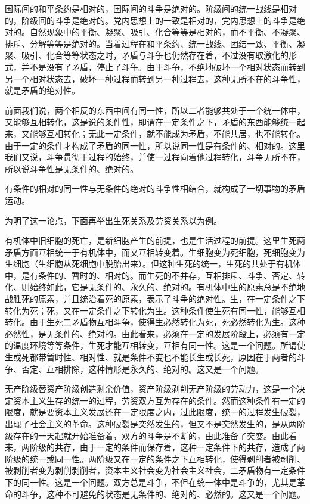 国际间的和平条约是相对的，国际间的斗争是绝对的。阶级间的统一战线是相对的，阶级间的斗争是绝对的。党内思想上的一致是相对的，党内思想上的斗争是绝对的。自然现象中的平衡、凝聚、吸引、化合等等是相对的，而不平衡、不凝聚、排斥、分解等等是绝对的。当着过程在和平条约、统一战线、团结一致、平衡、凝聚、吸引、化合等等状态之时，矛盾与斗争也仍然存在着，不过没有取激化的形式，并不是没有了矛盾，停止了斗争。由于斗争，不绝地破坏一个相对状态而转到另一个相对状态去，破坏一种过程而转到另一种过程去，这种无所不在的斗争性，就是矛盾的绝对性。

前面我们说，两个相反的东西中间有同一性，所以二者能够共处于一个统一体中，又能够互相转化，这是说的条件性，即谓在一定条件之下，矛盾的东西能够统一起来，又能够互相转化；无此一定条件，就不能成为矛盾，不能共居，也不能转化。由于一定的条件才构成了矛盾的同一性，所以说同一性是有条件的、相对的。这里我们又说，斗争贯彻于过程的始终，并使一过程向着他过程转化，斗争无所不在，所以说斗争性是无条件的、绝对的。

有条件的相对的同一性与无条件的绝对的斗争性相结合，就构成了一切事物的矛盾运动。

为明了这一论点，下面再举出生死关系及劳资关系以为例。

有机体中旧细胞的死亡，是新细胞产生的前提，也是生活过程的前提。这里生死两矛盾方面互相统一于有机体中，而又互相转变着。生细胞变为死细胞，死细胞变为生细胞（生细胞从死细胞中脱胎出来）。但这种生死的统一，生死的共处于有机体中，是有条件的、暂时的、相对的。而生死的不并存，互相排斥、斗争、否定、转化、则始终如此，它是无条件的、永久的、绝对的。有机体中生的原素总是不绝地战胜死的原素，并且统治着死的原素，表示了斗争的绝对性。生，在一定条件之下转化为死；死，又在一定条件之下转化为生。这种条件使生死有同一性，能够互相转化。由于生死二矛盾物互相斗争，使得生必然转化为死，死必然转化为生。这种必然性，是无条件的、绝对的。由此看来，必须在一定的发展阶段上，必须有一定的温度环境等等条件，生死才能互相转变，互相有同一性。这是一个问题。所谓使生或死都带暂时性、相对性、就是条件不变也不能长生或长死，原因在于两者的斗争、否定、互相排除，这种情形是永久的、绝对的。这又是一个问题。

无产阶级替资产阶级创造剩余价值，资产阶级剥削无产阶级的劳动力，这是一个决定资本主义生存的统一的过程，劳资双方互为存在的条件。然而这种条件有一定的限度，就是要资本主义发展还在一定限度之内，过此限度，统一的过程发生破裂，出现了社会主义的革命。这种破裂是突然发生的，但又不是突然发生的，是从两阶级存在的一天起就开始准备着，双方的斗争是不断的，由此准备了突变。由此看来，两阶级的共存，由于一定的条件而保存着，这种一定条件下的共存，造成了两阶级的统一或同一性。两阶级又在一定的条件之下互相转化，使得剥削者被剥削、被剥削者变为剥削剥削者，资本主义社会变为社会主义社会，二矛盾物有一定条件下的同一性。这是一个问题。双方总是斗争，不但在统一体中是斗争的，尤其是革命的斗争，这种不可避免的状态是无条件的、绝对的、必然的。这又是一个问题。

